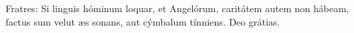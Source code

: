 Fratres: Si linguis hóminum loquar, et Angelórum, caritátem autem non hábeam, factus sum velut æs sonans, aut cýmbalum tínniens. \rubric{\Rbar} Deo grátias.
